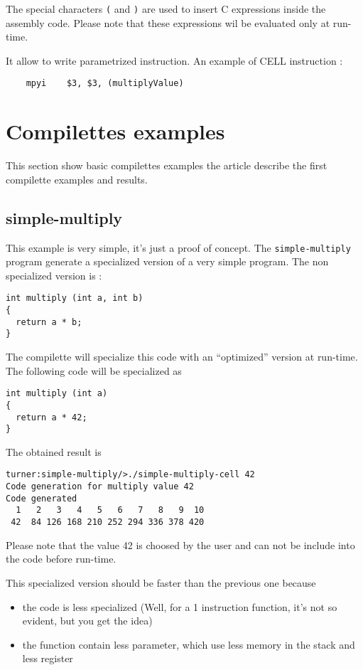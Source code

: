 \documentclass{article}
\begin{document}
The special characters \verb|(| and \verb|)| are used to insert C
expressions inside the assembly code. Please note that these
expressions wil be evaluated only at run-time.

It allow to write parametrized instruction. An example of CELL
instruction :
\begin{verbatim}
	mpyi    $3, $3, (multiplyValue) 
\end{verbatim}

\section{Compilettes examples}

This section show basic compilettes examples the article \cite{KB2004}
describe the first compilette examples and results.

\subsection{simple-multiply}

This example is very simple, it's just a proof of concept. The
\texttt{simple-multiply} program generate a specialized version of a
very simple program. The non specialized version is :

\begin{verbatim}
int multiply (int a, int b)
{
  return a * b;
}
\end{verbatim}

The compilette will specialize this code with an ``optimized'' version
at run-time. The following code will be specialized as

\begin{verbatim}
int multiply (int a)
{
  return a * 42;
}
\end{verbatim}

The obtained result is
\begin{verbatim}
turner:simple-multiply/>./simple-multiply-cell 42
Code generation for multiply value 42
Code generated
  1   2   3   4   5   6   7   8   9  10 
 42  84 126 168 210 252 294 336 378 420 
\end{verbatim}

Please note that the value 42 is choosed by the user and can not be
include into the code before run-time.

This specialized version should be faster than the previous one because
\begin{itemize}
\item the code is less specialized (Well, for a 1 instruction
  function, it's not so evident, but you get the idea)
\item the function contain less parameter, which use less memory in
  the stack and less register
\end{itemize}
\end{document}

